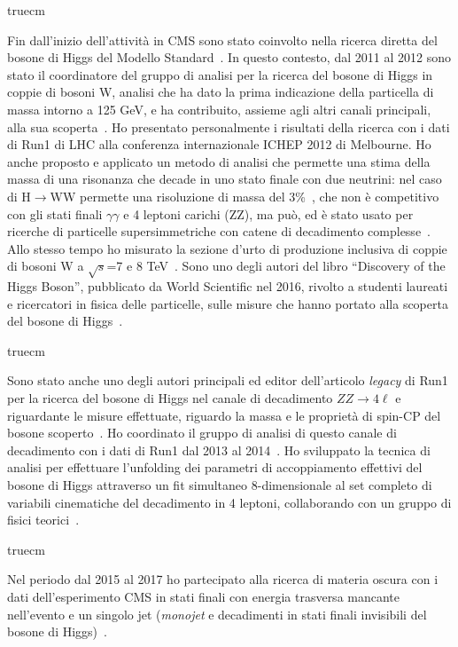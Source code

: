 \documentclass[11pt,twoside,a4paper]{article}
\begin{document}
 truecm

Fin dall'inizio dell'attivit\`a in CMS sono stato coinvolto nella
ricerca diretta del bosone di Higgs del Modello
Standard~\cite{Chatrchyan:2011tz,Chatrchyan:2012tx,Chatrchyan:2012ty}. In
questo contesto, dal 2011 al 2012 sono stato il coordinatore del
gruppo di analisi per la ricerca del bosone di Higgs in coppie di
bosoni W, analisi che ha dato la prima indicazione della particella di
massa intorno a 125 GeV, e ha contribuito, assieme agli altri canali
principali, alla sua
scoperta~\cite{Chatrchyan:2012ufa,Chatrchyan:2013lba,Chatrchyan:2012ufa}. Ho
presentato personalmente i risultati della ricerca con i dati di Run1
di LHC alla conferenza internazionale ICHEP 2012 di Melbourne. Ho
anche proposto e applicato un metodo di analisi che permette una stima
della massa di una risonanza che decade in uno stato finale con due
neutrini: nel caso di H$\to$WW permette una risoluzione di massa del
3\%~\cite{Chatrchyan:2013iaa}, che non \`e competitivo con gli stati
finali $\gamma\gamma$ e 4 leptoni carichi (ZZ), ma pu\`o, ed \`e stato
usato per ricerche di particelle supersimmetriche con catene di
decadimento complesse~\cite{Khachatryan:2016epu}. Allo stesso tempo ho
misurato la sezione d'urto di produzione inclusiva di coppie di bosoni
W a $\sqrt{s}$=7 e 8 TeV~\cite{Chatrchyan:2013yaa}. Sono uno degli
autori del libro ``Discovery of the Higgs Boson'', pubblicato da World
Scientific nel 2016, rivolto a studenti laureati e ricercatori in
fisica delle particelle, sulle misure che hanno portato alla scoperta
del bosone di Higgs~\cite{Nisati:2017cst}.

 truecm

Sono stato anche uno degli autori principali ed editor dell'articolo
\textit{legacy} di Run1 per la ricerca del bosone di Higgs nel canale
di decadimento $ZZ\to4\ell$ e riguardante le misure effettuate,
riguardo la massa e le propriet\`a di spin-CP del bosone
scoperto~\cite{Chatrchyan:2013mxa}. Ho coordinato il gruppo di analisi
di questo canale di decadimento con i dati di Run1 dal 2013 al
2014~\cite{Khachatryan:2014kca}. Ho sviluppato la tecnica di analisi
per effettuare l'unfolding dei parametri di accoppiamento effettivi
del bosone di Higgs attraverso un fit simultaneo 8-dimensionale al set
completo di variabili cinematiche del decadimento in 4 leptoni,
collaborando con un gruppo di fisici teorici~\cite{Chen:2014pia}.

 truecm

Nel periodo dal 2015 al 2017 ho partecipato alla ricerca di materia
oscura con i dati dell'esperimento CMS in stati finali con energia
trasversa mancante nell'evento e un singolo jet (\textit{monojet} e
decadimenti in stati finali invisibili del bosone di
Higgs)~\cite{Sirunyan:2017hci,Sirunyan:2017jix}.
\end{document}
